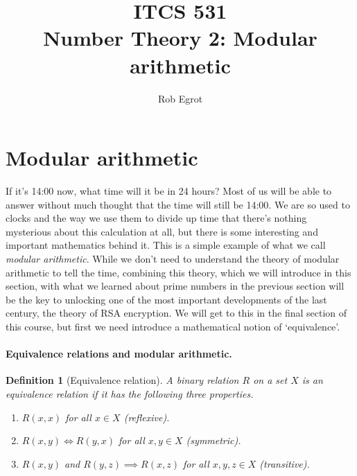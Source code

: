 \documentclass{article}
\title{ITCS 531 \\Number Theory 2: Modular arithmetic}
\author{Rob Egrot}
\date{}
\theoremstyle{plain}
\newtheorem{definition}[theorem]{Definition}{\bfseries}{\upshape}
\begin{document}
\maketitle


\section{Modular arithmetic}
If it's 14:00 now, what time will it be in 24 hours? Most of us will be able to answer without much thought that the time will still be 14:00. We are so used to clocks and the way we use them to divide up time that there's nothing mysterious about this calculation at all, but there is some interesting and important mathematics behind it. This is a simple example of what we call \emph{modular arithmetic}. While we don't need to understand the theory of modular arithmetic to tell the time, combining this theory, which we will introduce in this section, with what we learned about prime numbers in the previous section will be the key to unlocking one of the most important developments of the last century, the theory of RSA encryption. We will get to this in the final section of this course, but first we need introduce a mathematical notion of `equivalence'.   

\paragraph{Equivalence relations and modular arithmetic.}
\begin{definition}[Equivalence relation]\label{D:equiv}
A binary relation $R$ on a set $X$ is an \emph{equivalence relation} if it has the following three properties.
\begin{enumerate}
\item $R(x,x)$ for all $x\in X$ (reflexive).  
\item $R(x,y)\iff R(y,x)$ for all $x,y\in X$ (symmetric).
\item $R(x,y)$ and $R(y,z)\implies R(x,z)$ for all $x,y,z\in X$ (transitive).
\end{enumerate}
\end{definition}
\end{document}
